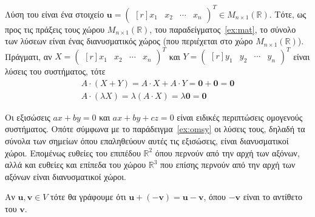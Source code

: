\begin{examples}
\begin{enumerate}
\begin{equation*}
            \end{equation*} 
            Λύση του είναι ένα στοιχείο $ \mathbf{u} = 
            \begin{pmatrix*}[r]
                x_{1} & x_{2} & \cdots & x_{n} 
            \end{pmatrix*}^{T} \in M_{n \times 1}(\mathbb{R}) $.  Τότε, ως 
            προς τις πράξεις τους χώρου 
            $ M_{n \times 1}(\mathbb{R}) $, του παραδείγματος~\ref{ex:mat}, 
            το σύνολο των λύσεων είναι ένας διανυσματικός χώρος 
            (που περιέχεται στο χώρο $ M_{n \times 1}(\mathbb{R}) $). Πράγματι, 
            αν $ X =\begin{pmatrix*}[r]
                x_{1} & x_{2} & \cdots & x_{n} 
                \end{pmatrix*}^{T} $ και $ Y = \begin{pmatrix*}[r]
                y_{1} & y_{2} & \cdots & y_{n} 
            \end{pmatrix*}^{T} $ είναι λύσεις του συστήματος, τότε
            \begin{gather*}
                A \cdot (X+Y) = A \cdot X + A \cdot Y = \mathbf{0}+ \mathbf{0} = 
                \mathbf{0} \\
                A \cdot (\lambda X) = \lambda (A \cdot X) = \lambda \mathbf{0} = 
                \mathbf{0}
            \end{gather*} 
    \end{enumerate}
\end{examples}

\begin{rem}
    Οι εξισώσεις $ ax + by = 0 $ και $ ax + by + cz = 0 $ είναι ειδικές 
    περιπτώσεις ομογενούς συστήματος. Οπότε σύμφωνα με το παράδειγμα~\ref{ex:omsy} 
    οι λύσεις τους, δηλαδή τα σύνολα των σημείων όπου επαληθεύουν αυτές τις εξισώσεις, 
    είναι διανυσματικοί χώροι. Επομένως ευθείες του επιπέδου $ \mathbb{R}^{2} $ 
    όπου περνούν από την αρχή των αξόνων, αλλά και ευθείες και επίπεδα του χώρου 
    $ \mathbb{R}^{3} $ που επίσης περνούν από την αρχή των αξόνων είναι 
    διανυσματικοί χώροι.
\end{rem}

\begin{rem}
\item {}
    Αν $ \mathbf{u}, \mathbf{v} \in V $ τότε θα γράφουμε ότι 
    $ \mathbf{u} + (- \mathbf{v}) = \mathbf{u} - \mathbf{v} $, 
    όπου $ - \mathbf{v} $ είναι το αντίθετο του $ \mathbf{v} $.
\end{rem}


